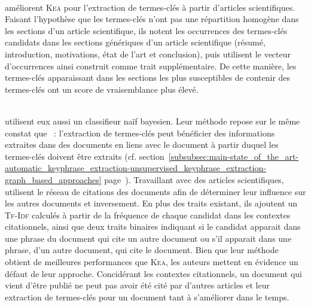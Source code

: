         ~\\ améliorent \textsc{Kea} pour
        l'extraction de termes-clés à partir d'articles scientifiques. Faisant
        l'hypothèse que les termes-clés n'ont pas une répartition homogène dans
        les sections d'un article scientifique, ils notent les occurrences des
        termes-clés candidats dans les sections génériques d'un article
        scientifique (résumé, introduction, motivations, état de l'art et
        conclusion), puis utilisent le vecteur d'occurrences ainsi construit
        comme trait supplémentaire. De cette manière, les termes-clés
        apparaissant dans les sections les plus susceptibles de contenir des
        termes-clés ont un score de vraisemblance plus élevé.
        
        ~\\ utilisent
        eux aussi un classifieur naïf bayesien. Leur méthode repose sur le même
        constat que ~: l'extraction de termes-clés
        peut bénéficier des informations extraites dans des documents en liens
        avec le document à partir duquel les termes-clés doivent être extraits
        (cf.
        section~\ref{subsubsec:main-state_of_the_art-automatic_keyphrase_extraction-unsupervised_keyphrase_extraction-graph_based_approaches}
        page~\pageref{subsubsec:main-state_of_the_art-automatic_keyphrase_extraction-unsupervised_keyphrase_extraction-graph_based_approaches}).
        Travaillant avec des articles scientifiques,
         utilisent le
        réseau de citations des documents afin de déterminer leur influence sur
        les autres documents et inversement. En plus des traits existant, ils
        ajoutent un \textsc{Tf-Idf} calculés à partir de la fréquence de chaque
        candidat dans les contextes citationnels, ainsi que deux traits binaires
        indiquant si le candidat apparait dans une phrase du document qui cite
        un autre document ou s'il apparait dans une phrase, d'un autre document,
        qui cite le document. Bien que leur méthode obtient de meilleures
        performances que \textsc{Kea}, les auteurs mettent en évidence un défaut
        de leur approche. Concidérant les contextes citationnels, un document
        qui vient d'être publié ne peut pas avoir été cité par d'autres articles
        et leur extraction de termes-clés pour un document tant à s'améliorer
        dans le temps.

